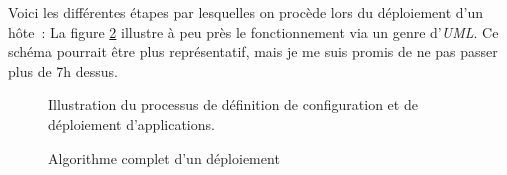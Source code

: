 Voici les différentes étapes par lesquelles on procède lors du déploiement d'un hôte~:
La figure \ref{1.4_algorithme_complet} illustre à peu près le fonctionnement via un genre d'\emph{UML}.
Ce schéma pourrait être plus représentatif, mais je me suis promis de ne pas passer plus de 7h dessus.

\begin{figure}
	\centerfloat
	\caption{Illustration du processus de définition de configuration et de déploiement d'applications.}
	\label{1.4_definition_runlist}
	
\end{figure}

\begin{figure}
	\centerfloat
	\caption{Algorithme complet d'un déploiement}
	\label{1.4_algorithme_complet}
	
\end{figure}

